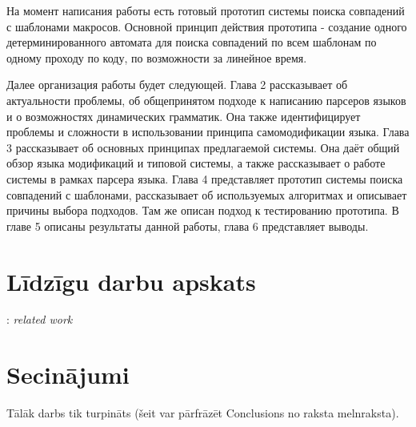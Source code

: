 \documentclass[12pt, a4paper]{report}
\newcommand{\fixme}[1]{\vskip 5mm\noindent{\bf FIXME}: {\it #1}}
\begin{document}
На момент написания работы есть готовый прототип системы поиска совпадений с шаблонами макросов. Основной принцип действия прототипа - создание одного детерминированного автомата для поиска совпадений по всем шаблонам по одному проходу по коду, по возможности за линейное время.

Далее организация работы будет следующей. Глава 2 рассказывает об актуальности проблемы, об общепринятом подходе к написанию парсеров языков и о возможностях динамических грамматик. Она также идентифицирует проблемы и сложности в использовании принципа самомодификации языка. Глава 3 рассказывает об основных принципах предлагаемой системы. Она даёт общий обзор языка модификаций и типовой системы, а также рассказывает о работе системы в рамках парсера языка. Глава 4 представляет прототип системы поиска совпадений с шаблонами, рассказывает об используемых алгоритмах и описывает причины выбора подходов. Там же описан подход к тестированию прототипа. В главе 5 описаны результаты данной работы, глава 6 представляет выводы.

%







\section{Līdzīgu darbu apskats}

\fixme{related work}



\section{Secinājumi}

Tālāk darbs tik turpināts (šeit var pārfrāzēt Conclusions no raksta melnraksta).



%

{}

\end{document}
